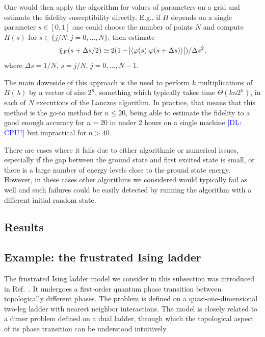 \documentclass[american,aps,pra,reprint,floatfix,nofootinbib,superscriptaddress]{revtex4-2}
\newcommand{\DL}[1]{\textcolor{blue}{[DL: #1]}}
\begin{document}
One would then apply the algorithm for values of parameters on a grid
and estimate the fidelity susceptibility directly. E.g., if $H$ depends
on a single parameter $s\in[0,1]$ one could choose the number of points $N$
and compute $H(s)$ for $s\in\{j/N: j=0,\dots,N\}$, then estimate
\begin{equation}
  \hat \chi_F(s + \Delta s/2)
    \simeq 2 (1 - \abs{\braket{\varphi(s)| \varphi(s + \Delta s)}})
      / \Delta s^2,
\end{equation}
where $\Delta s = 1/N$, $s = j/N$, $j=0,\dots,N-1$.

The main downside of this approach is the need to perform $k$
multiplications of $H(\lambda)$ by a vector of size $2^n$, something
which typically takes time $\Theta(kn2^n)$, in each of $N$ executions
of the Lanczos algorithm. In practice, that means that
this method is the go-to method for $n \leq 20$, being able to estimate
the fidelity to a good enough accuracy for $n=20$ in under 2 hours on a
single machine \DL{CPU?} but impractical for $n > 40$.

There are cases where it fails due to either algorithmic or numerical issues,
especially if the gap between the ground state and first excited state is small,
or there is a large number of energy levels close to the ground state energy.
However, in these cases other algorithms we considered would typically fail
as well and such failures could be easily detected by running the algorithm
with a different initial random state.

\subsection{Results}

\subsection{Example: the frustrated Ising ladder}

The frustrated Ising ladder model we consider in this subsection was introduced in Ref.~\cite{Laumann:2012hs}. It undergoes a first-order 
quantum phase transition between topologically different
phases. The problem is defined
on a quasi-one-dimensional two-leg ladder with nearest neighbor interactions. The model is closely related to a dimer
problem defined on a dual ladder, through which the topological aspect of its phase transition can be understood intuitively
\end{document}
